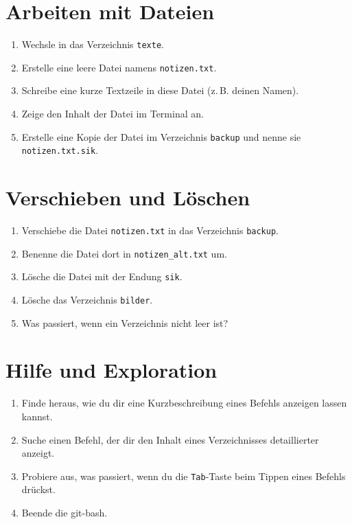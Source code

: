 \documentclass[a4paper,11pt]{article}
\begin{document}
\section{Arbeiten mit Dateien}

\begin{enumerate}[label=\arabic*.]
  \item Wechsle in das Verzeichnis \texttt{texte}.
  \item Erstelle eine leere Datei namens \texttt{notizen.txt}.
  \item Schreibe eine kurze Textzeile in diese Datei (z.\,B. deinen Namen).
  \item Zeige den Inhalt der Datei im Terminal an.
  \item Erstelle eine Kopie der Datei im Verzeichnis \texttt{backup} und nenne sie \texttt{notizen.txt.sik}.
\end{enumerate}

\section{Verschieben und Löschen}

\begin{enumerate}[label=\arabic*.]
  \item Verschiebe die Datei \texttt{notizen.txt} in das Verzeichnis \texttt{backup}.
  \item Benenne die Datei dort in \texttt{notizen\_alt.txt} um.
  \item Lösche die Datei mit der Endung \texttt{sik}.
  \item Lösche das Verzeichnis \texttt{bilder}.
  \item Was passiert, wenn ein Verzeichnis nicht leer ist?
\end{enumerate}

\section{Hilfe und Exploration}

\begin{enumerate}[label=\arabic*.]
  \item Finde heraus, wie du dir eine Kurzbeschreibung eines Befehls anzeigen lassen kannst.
  \item Suche einen Befehl, der dir den Inhalt eines Verzeichnisses detaillierter anzeigt.
  \item Probiere aus, was passiert, wenn du die \texttt{Tab}-Taste beim Tippen eines Befehls drückst.
  \item Beende die git-bash.
\end{enumerate}
\end{document}
